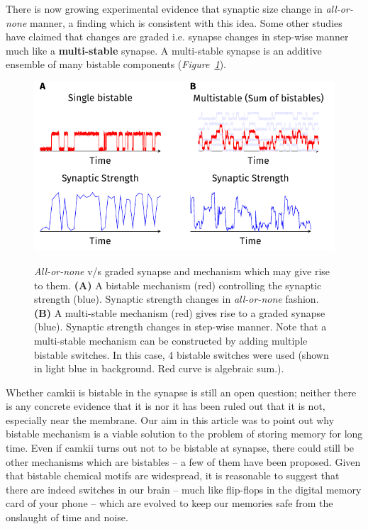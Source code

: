 \documentclass[]{resonance}
\newcommand\Fig[1]{\textit{Figure~\ref{#1}}}
\begin{document}
There is now growing experimental evidence that synaptic size change in
\textit{all-or-none} manner, a finding which is consistent with this idea. Some
other studies have claimed that changes are graded i.e. synapse changes in
step-wise manner much like a \textbf{multi-stable} synapse. A multi-stable
synapse is an additive ensemble of many bistable components
(\Fig{fig:fig_bistable_multistable}).

\begin{figure}[ht!]
    \centering
    \caption{\textit{All-or-none} v/s graded synapse and mechanism which may
        give rise to them. \textbf{(A)} A bistable mechanism (red) controlling the 
        synaptic strength (blue). Synaptic strength changes in \textit{all-or-none}
        fashion. \textbf{(B)} A multi-stable mechanism (red) gives rise to a
        graded synapse (blue). Synaptic strength changes in step-wise manner. Note that 
        a multi-stable mechanism can be constructed by adding multiple bistable
        switches. In this case, 4 bistable switches were used (shown in light
        blue in background. Red curve is algebraic sum.).
    }
    \includegraphics[width=\linewidth]{./bistable_multistabe_synapse.pdf}
    \label{fig:fig_bistable_multistable}
\end{figure}


Whether \gls{camkii} is bistable in the synapse is still an open question;
neither there is any concrete evidence that it is nor it has been ruled out that
it is not, especially near the membrane. Our aim in this article was to point
out why bistable mechanism is a viable solution to the problem of storing memory
for long time. Even if \gls{camkii} turns out not to be bistable at synapse,
there could still be other mechanisms which are bistables -- a few of them have
been proposed. Given that bistable chemical motifs are widespread, it is
reasonable to suggest that there are indeed switches in our brain -- much like
flip-flops in the digital memory card of your phone -- which are evolved to keep
our memories safe from the onslaught of time and noise.
\end{document}
